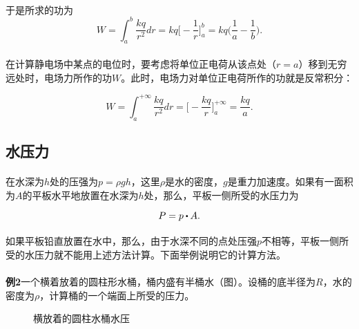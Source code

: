 \paragraph{}
于是所求的功为
\begin{equation}
  W = \int_a^b\frac{kq}{r^2}dr = kq\big[ -\frac{1}{r} \big]_a^b = kq\big( \frac{1}{a} - \frac{1}{b} \big).
\end{equation}

\paragraph{}
在计算静电场中某点的电位时，要考虑将单位正电荷从该点处（$r=a$）移到无穷远处时，电场力所作的功$W$。此时，电场力对单位正电荷所作的功就是反常积分：

\begin{equation}
  W = \int_a^{+\infty}\frac{kq}{r^2}dr = \big[ -\frac{kq}{r} \big]_a^{+\infty} = \frac{kq}{a}.
\end{equation}

\subsection{水压力}
\paragraph{}
在水深为$h$处的压强为$p = \rho gh$，这里$\rho$是水的密度，$g$是重力加速度。如果有一面积为$A$的平板水平地放置在水深为$h$处，那么，平板一侧所受的水压力为

\begin{equation}
  P = p \bigcdot A.
\end{equation}

\paragraph{}
如果平板铅直放置在水中，那么，由于水深不同的点处压强$p$不相等，平板一侧所受的水压力就不能用上述方法计算。下面举例说明它的计算方法。

\paragraph{}
\textbf{例2\;}一个横着放着的圆柱形水桶，桶内盛有半桶水（图）。设桶的底半径为$R$，水的密度为$\rho$，计算桶的一个端面上所受的压力。

\begin{figure}[h]
\centering
  \begin{subfigure}[t]{0.42\linewidth}
    \centering
      
      \caption{}
      \label{横放着的圆柱水桶水压a}
  \end{subfigure}
  \begin{subfigure}[t]{0.42\linewidth}
    \centering
      
      \caption{}
      \label{横放着的圆柱水桶水压b}
  \end{subfigure}

  \caption{横放着的圆柱水桶水压}
  \label{横放着的圆柱水桶水压}
\end{figure}

